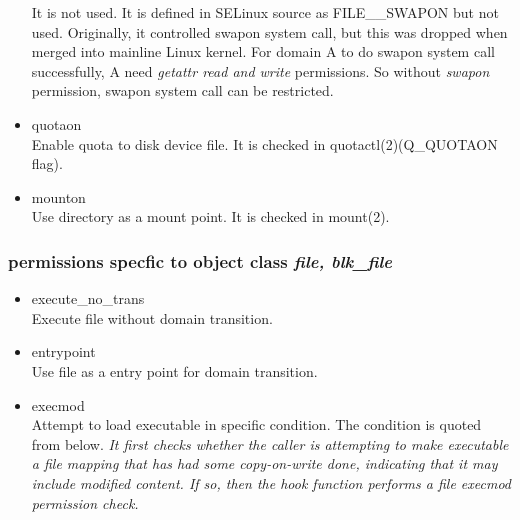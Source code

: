 \documentclass{article}
\begin{document}
\begin{itemize}
       It is not used. It is defined in SELinux source as
       FILE\_\_SWAPON but not used. Originally, it controlled swapon system
       call, but this was dropped when merged into mainline Linux
       kernel. For domain A to do swapon system call successfully, A need {\it getattr
       read and write } permissions. So without {\it swapon} permission, swapon system call can be restricted.
       
 \item quotaon\\
       Enable quota to disk device file. It is checked in quotactl(2)(Q\_QUOTAON flag).
 \item mounton\\
       Use directory as a mount point. It is checked in mount(2).       
\end{itemize}
      
\subsubsection{permissions specfic to object class {\it file,
   blk\_file}}
   \begin{itemize}
    \item execute\_no\_trans\\
	     Execute file without domain transition.
    \item entrypoint\\
	     Use file as a entry point for domain transition.
    \item  execmod\\
	  Attempt to load executable in specific condition. The condition
	  is quoted from \cite{selinuximplementation} below. {\it It first checks whether the caller is attempting to make executable a file mapping that has had some
	  copy-on-write done, indicating that it may include modified content. If so, then the hook function
	  performs a file execmod permission check.}
   \end{itemize}
    
\end{document}
